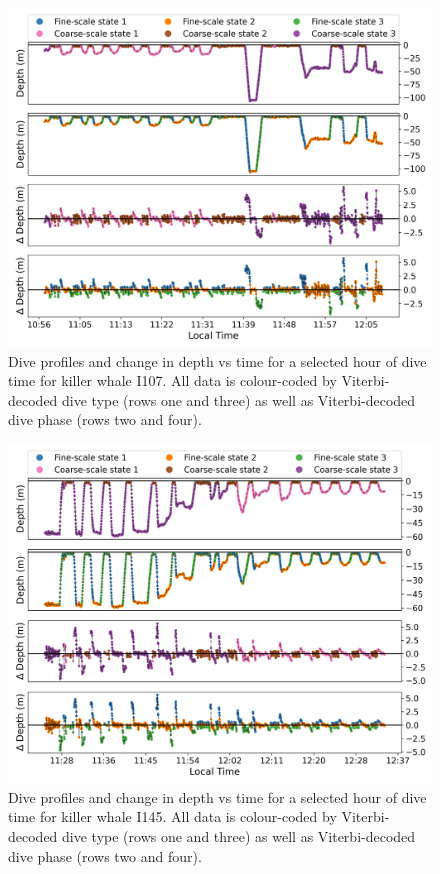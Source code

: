 \documentclass[12pt]{article}
\begin{document}
\begin{figure}[H]
    \centering
    \includegraphics[width=6.5in]{../plt/decoded_dives_kw_I107_K_3_3_nWhales_8.png}
    \caption{Dive profiles and change in depth vs time for a selected hour of dive time for killer whale I107. All data is colour-coded by Viterbi-decoded dive type (rows one and three) as well as Viterbi-decoded dive phase (rows two and four).}
    \label{fig:I107}
\end{figure}

\begin{figure}[H]
    \centering
    \includegraphics[width=6.5in]{../plt/decoded_dives_kw_I145_K_3_3_nWhales_8.png}
    \caption{Dive profiles and change in depth vs time for a selected hour of dive time for killer whale I145. All data is colour-coded by Viterbi-decoded dive type (rows one and three) as well as Viterbi-decoded dive phase (rows two and four).}
    \label{fig:I145}
\end{figure}
\end{document}
